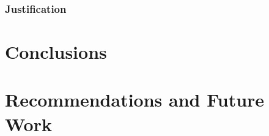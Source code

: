 \documentclass{erauthesis}
\begin{document}
\subsection{Justification} \label{fusion_justificaiton}





\chapter{Conclusions}

% 

% 

% 


\chapter{Recommendations and Future Work} \label{chap:recommendations}
% 

\end{document}
